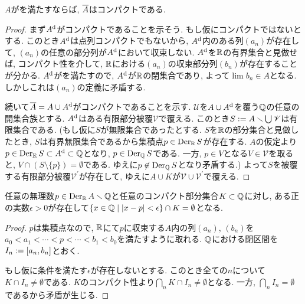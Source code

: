 \documentclass[uplatex, dvipdfmx, a4paper, 12pt, class=jsbook, crop=false]{standalone}
\begin{document}
\begin{lemma}
	$ A $がを満たすならば, $ \overline{A} $はコンパクトである.
\end{lemma}
\begin{proof}
	まず$ A^{\mathrm{d}} $がコンパクトであることを示そう. もし仮にコンパクトではないとする. このとき$ A^{\mathrm{d}} $は点列コンパクトでもないから, $ A^{\mathrm{d}} $内のある列$ (a_n) $が存在して, $ (a_n) $の任意の部分列が$ A^{\mathrm{d}} $において収束しない. $ A^{\mathrm{d}} $を$ \mathbb{R} $の有界集合と見做せば, コンパクト性を介して, $ \mathbb{R} $における$ (a_n) $の収束部分列$ (b_n) $が存在することが分かる. $ A^{\mathrm{d}} $がを満たすので, $ A^{\mathrm{d}} $が$ \mathbb{R} $の閉集合であり, よって$ \lim b_n \in A $となる. しかしこれは$ (a_n) $の定義に矛盾する.

	続いて$ \overline{A} = A \cup A^{\mathrm{d}} $がコンパクトであることを示す. $ \mathscr{U} $を$ A \cup A^{\mathrm{d}} $を覆う$ \mathbb{Q} $の任意の開集合族とする. $ A^{\mathrm{d}} $はある有限部分被覆$ \mathscr{V} $で覆える. このとき$ S \mathrel{:=} A \smallsetminus \bigcup \mathscr{V} $は有限集合である. (もし仮に$ S $が無限集合であったとする. $ S $を$ \mathbb{R} $の部分集合と見做したとき, $ S $は有界無限集合であるから集積点$ p \in \mathop{\mathrm{Der}}\nolimits_{\mathbb{R}} S $が存在する. $ A $の仮定より$ p \in \mathop{\mathrm{Der}}\nolimits_{\mathbb{R}} S \subset A^{\mathrm{d}} \subset \mathbb{Q} $となり, $ p \in \mathop{\mathrm{Der}}\nolimits_{\mathbb{Q}} S $である. 一方, $ p \in V $となる$ V \in \mathscr{V} $を取ると, $ V \cap (S \setminus \{p\}) = \emptyset $である. ゆえに$ p \not\in \mathop{\mathrm{Der}}\nolimits_{\mathbb{Q}} S $となり矛盾する.) よって$ S $を被覆する有限部分被覆$ \mathscr{V}^\prime $が存在して, ゆえに$ A \cup K $が$ \mathscr{V} \cup \mathscr{V}^\prime $で覆える.
\end{proof}

\begin{lemma}
	任意の無理数$ p \in \mathop{\mathrm{Der}}\nolimits_{\mathbb{R}} A \smallsetminus \mathbb{Q} $と任意のコンパクト部分集合$ K \subset \mathbb{Q} $に対し, ある正の実数$ \epsilon > 0 $が存在して$ \setcomp{x \in \Q}{| x- p | < \epsilon} \cap K = \emptyset $となる.
\end{lemma}
\begin{proof}
	$ p $は集積点なので, $ \mathbb{R} $にて$ p $に収束する$ A $内の列$ (a_n) $, $ (b_n) $を$ a_0 < a_1 < \cdots < p < \cdots < b_1 < b_0 $を満たすように取れる. $ \mathbb{Q} $における閉区間を$ I_n \mathrel{:=} [a_n, b_n] $とおく.

	もし仮に条件を満たす$ \epsilon $が存在しないとする. このとき全ての$ n $について$ K \cap I_n  \neq \emptyset $である. $ K $のコンパクト性より$ \bigcap_n K \cap I_n \neq \emptyset  $となる. 一方, $ \bigcap_n I_n = \emptyset $であるから矛盾が生じる.
\end{proof}
\end{document}

